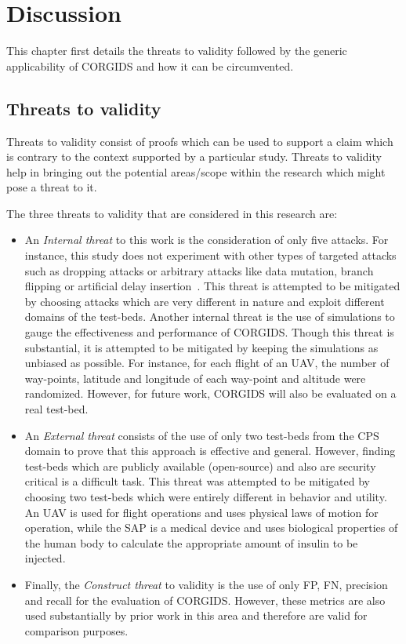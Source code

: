 
\chapter{\textbf{Discussion}}
\label{sec7:Discussion}
This chapter first details the threats to validity followed by the generic applicability of CORGIDS and how it can be circumvented.

\section{Threats to validity}
Threats to validity consist of proofs which can be used to support a claim which is contrary to the context supported by a particular study. Threats to validity help in bringing out the potential areas/scope within the research which might pose a threat to it.

The three threats to validity that are considered in this research are:

\begin{itemize}
\item An \textit{Internal threat} to this work is the consideration of only five attacks. For instance, this study does not experiment with other types of targeted attacks such as dropping attacks or arbitrary attacks like data mutation, branch flipping or artificial delay insertion~\cite{aliabadi2017artinali}. This threat is  attempted to be mitigated by choosing attacks which are very different in nature and exploit different domains of the test-beds. Another internal threat is the use of simulations to gauge the effectiveness and performance of CORGIDS. Though this threat is substantial, it is attempted to be mitigated by keeping the simulations as unbiased as possible. For instance, for each flight of an UAV, the number of way-points, latitude and longitude of each way-point and altitude were randomized. However, for future work, CORGIDS will also be evaluated on a real test-bed. 

\item An \textit{External threat} consists of the use of only two test-beds from the CPS domain to prove that this approach is effective and general. However, finding test-beds which are publicly available (open-source) and also are security critical is a difficult task. This threat was attempted to be mitigated by choosing two test-beds which were entirely different in behavior and utility. An UAV is used for flight operations and uses physical laws of motion for operation, while the SAP is a medical device and uses biological properties of the human body to calculate the appropriate amount of insulin to be injected. 

\item Finally, the \textit{Construct  threat} to validity is the use of only FP, FN, precision and recall for the evaluation of CORGIDS. However, these metrics are also used substantially by prior work in this area and therefore are valid for comparison purposes. 
\end{itemize}

